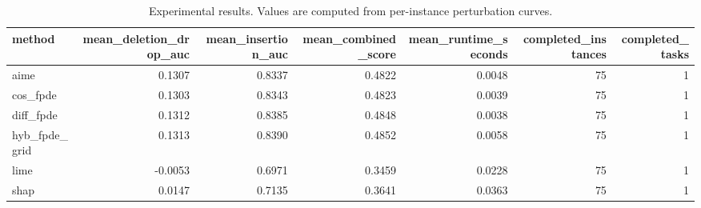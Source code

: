 \begin{table}[t]
\caption{Experimental results. Values are computed from per-instance perturbation curves.}
\label{tab:main_results_computed}
\centering
\begin{tabular}{lrrrrrr}
\toprule
method & mean\_deletion\_drop\_auc & mean\_insertion\_auc & mean\_combined\_score & mean\_runtime\_seconds & completed\_instances & completed\_tasks \\
\midrule
aime & 0.1307 & 0.8337 & 0.4822 & 0.0048 & 75 & 1 \\
cos\_fpde & 0.1303 & 0.8343 & 0.4823 & 0.0039 & 75 & 1 \\
diff\_fpde & 0.1312 & 0.8385 & 0.4848 & 0.0038 & 75 & 1 \\
hyb\_fpde\_grid & 0.1313 & 0.8390 & 0.4852 & 0.0058 & 75 & 1 \\
lime & -0.0053 & 0.6971 & 0.3459 & 0.0228 & 75 & 1 \\
shap & 0.0147 & 0.7135 & 0.3641 & 0.0363 & 75 & 1 \\
\bottomrule
\end{tabular}

\end{table}
